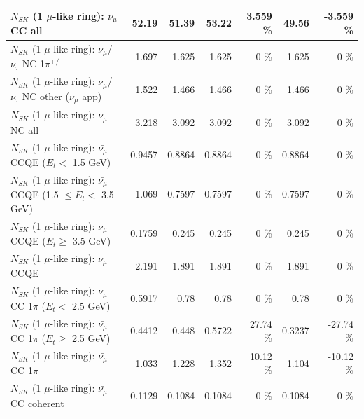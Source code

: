\begin{table}
\begin{tabular}{| l | r | r | r  r | r  r |}
                                $N_{SK}$ (1 $\mu$-like ring): $\nu_{\mu}$ CC all &           52.19 &           51.39 &           53.22 &    3.559 \%  &           49.56 &   -3.559 \%  \\ 
\hline
              $N_{SK}$ (1 $\mu$-like ring): $\nu_\mu$/$\nu_\tau$ NC 1$\pi^{+/-}$ &           1.697 &           1.625 &           1.625 &        0 \%  &           1.625 &        0 \%  \\ 
     $N_{SK}$ (1 $\mu$-like ring): $\nu_\mu$/$\nu_\tau$ NC other ($\nu_\mu$ app) &           1.522 &           1.466 &           1.466 &        0 \%  &           1.466 &        0 \%  \\ 
                                $N_{SK}$ (1 $\mu$-like ring): $\nu_{\mu}$ NC all &           3.218 &           3.092 &           3.092 &        0 \%  &           3.092 &        0 \%  \\ 
\hline
\hline
\hline
          $N_{SK}$ (1 $\mu$-like ring): $\bar{\nu_\mu}$ CCQE ($E_{t} <$ 1.5 GeV) &          0.9457 &          0.8864 &          0.8864 &        0 \%  &          0.8864 &        0 \%  \\ 
 $N_{SK}$ (1 $\mu$-like ring): $\bar{\nu_\mu}$ CCQE (1.5 $\leq E_{t} <$ 3.5 GeV) &           1.069 &          0.7597 &          0.7597 &        0 \%  &          0.7597 &        0 \%  \\ 
       $N_{SK}$ (1 $\mu$-like ring): $\bar{\nu_\mu}$ CCQE ($E_{t} \geq$ 3.5 GeV) &          0.1759 &           0.245 &           0.245 &        0 \%  &           0.245 &        0 \%  \\ 
\hline
                              $N_{SK}$ (1 $\mu$-like ring): $\bar{\nu_\mu}$ CCQE &           2.191 &           1.891 &           1.891 &        0 \%  &           1.891 &        0 \%  \\ 
\hline
     $N_{SK}$ (1 $\mu$-like ring): $\bar{\nu_\mu}$ CC 1$\pi$ ($E_{t} <$ 2.5 GeV) &          0.5917 &            0.78 &            0.78 &        0 \%  &            0.78 &        0 \%  \\ 
  $N_{SK}$ (1 $\mu$-like ring): $\bar{\nu_\mu}$ CC 1$\pi$ ($E_{t} \geq$ 2.5 GeV) &          0.4412 &           0.448 &          0.5722 &    27.74 \%  &          0.3237 &   -27.74 \%  \\ 
\hline
                         $N_{SK}$ (1 $\mu$-like ring): $\bar{\nu_\mu}$ CC 1$\pi$ &           1.033 &           1.228 &           1.352 &    10.12 \%  &           1.104 &   -10.12 \%  \\ 
                       $N_{SK}$ (1 $\mu$-like ring): $\bar{\nu_\mu}$ CC coherent &          0.1129 &          0.1084 &          0.1084 &        0 \%  &          0.1084 &        0 \%  \\ 

\end{tabular}
\end{table}
